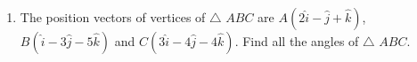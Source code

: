 \begin{enumerate}
\begin{enumerate}
			\item Both Assertion $(A)$ and Reason $(R)$ are true, but Reason $(R)$ is not the correct explaination of Assertion $(A)$
			\item Assertion $(A)$ is true, but Reason $(R)$ is false
			\item Assertion $(A)$ is false, but Reason $(R)$ is true
		\end{enumerate}
	\item The position vectors of vertices of $\bigtriangleup$ $ABC$ are $A(2\hat{i} - \hat{j} + \hat{k})$, $B(\hat{i} - 3\hat{j} - 5\hat{k})$ and  $C(3\hat{i} - 4\hat{j} - 4\hat{k})$. Find all the angles of $\bigtriangleup$ $ABC$.
\end{enumerate}

